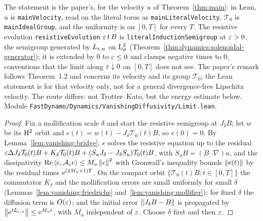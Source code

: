 The statement is the paper's, for the velocity $u$ of Theorem~\ref{thm:main}: in Lean,
$u$ is \texttt{mainVelocity}, read on the literal torus as \texttt{mainLiteralVelocity},
$\mathcal T_0$ is \texttt{mainIdealGroup}, and the uniformity is on $[0,T]$ for every $T$.  The
resistive evolution \texttt{resistiveEvolution} $\varepsilon\,t\,B$ is
\texttt{literalInductionSemigroup} at $\varepsilon>0$, the semigroup generated by $L_{\varepsilon,u}$ on
$\mathrm{L}^2_\sigma$ (Theorem~\ref{thm:dynamics:solenoidal-generator}); it is extended by $0$ to
$\varepsilon\leq0$ and clamps negative times to $0$, conventions that the limit along
$\varepsilon\downarrow0$ on $[0,T]$ does not see.  The paper's remark follows Theorem~1.2 and
concerns its velocity and its group $\mathcal T_0$; the Lean statement is for that velocity
only, not for a general divergence-free Lipschitz velocity.  The route differs: not
Trotter--Kato, but the energy estimate below.  Module
\texttt{FastDynamo/Dynamics/VanishingDiffusivity/Limit.lean}.

\begin{proof}
  \leanok
  Fix a mollification scale $\delta$ and start the resistive semigroup at $J_\delta B$; let $w$
  be its $\mathrm{H}^2$ orbit and $e(t)=w(t)-J_\delta\mathcal T_0(t)B$, so $e(0)=0$.  By
  Lemma~\ref{lem:vanishing:bridge}, $e$ solves the resistive equation up to the residual
  $\varepsilon\Delta J_\delta\mathcal T_0(t)B+K_\delta\mathcal T_0(t)B
  +(S_uJ_\delta-J_\delta S_u)\mathcal T_0(t)B$, with $S_uB=(B\cdot\nabla)u$,
  and the dissipativity $\operatorname{Re}\left\langle e,\mathcal A_\varepsilon e\right\rangle\leq M_u\left\|e\right\|^2$ with Gronwall's
  inequality bounds $\left\|e(t)\right\|$ by the residual times $\mathrm{e}^{(2M_u+1)T}$.  On the compact orbit
  $\{\mathcal T_0(t)B:t\in[0,T]\}$ the commutator $K_\delta$ and the mollification errors are
  small uniformly for small $\delta$ (Lemmas~\ref{lem:vanishing:friedrichs}
  and~\ref{lem:vanishing:mollifier}); for fixed $\delta$ the diffusion term is $O(\varepsilon)$; and
  the initial error $\left\|J_\delta B-B\right\|$ is propagated by
  $\left\|\mathrm{e}^{tL_{\varepsilon,u}}\right\|\leq\mathrm{e}^{M_ut}$, with $M_u$ independent of $\varepsilon$.  Choose $\delta$
  first and then $\varepsilon$.
\end{proof}
